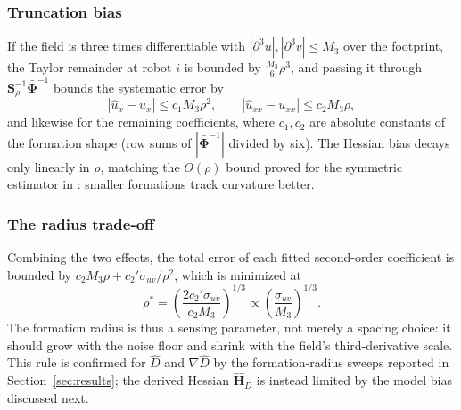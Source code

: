 \documentclass[lettersize,journal]{IEEEtran}
\begin{document}
\subsubsection{Truncation bias}
If the field is three times differentiable with
$|\partial^3 u|, |\partial^3 v| \leq M_3$ over the footprint, the Taylor
remainder at robot $i$ is bounded by $\tfrac{M_3}{6}\rho^3$, and passing
it through $\mathbf{S}_\rho^{-1}\bar{\boldsymbol{\Phi}}^{-1}$ bounds the
systematic error by
\begin{equation}
    |\hat{u}_x - u_x| \leq c_1 M_3 \rho^2, \qquad
    |\hat{u}_{xx} - u_{xx}| \leq c_2 M_3 \rho,
    \label{eq:truncation}
\end{equation}
and likewise for the remaining coefficients, where $c_1, c_2$ are
absolute constants of the formation shape (row sums of
$|\bar{\boldsymbol{\Phi}}^{-1}|$ divided by six). The Hessian bias decays
only linearly in $\rho$, matching the $O(\rho)$ bound proved for the
symmetric estimator in \cite{15}: smaller formations track curvature better.

\subsubsection{The radius trade-off}
Combining the two effects, the total error of each fitted second-order
coefficient is bounded by
$c_2 M_3 \rho + c_2' \sigma_{uv}/\rho^2$, which is minimized at
\begin{equation}
    \rho^* = \left(\frac{2 c_2' \sigma_{uv}}{c_2 M_3}\right)^{1/3}
    \propto \left(\frac{\sigma_{uv}}{M_3}\right)^{1/3}.
    \label{eq:rho_star}
\end{equation}
The formation radius is thus a sensing parameter, not merely a spacing
choice: it should grow with the noise floor and shrink with the field's
third-derivative scale. This rule is confirmed for $\hat{D}$ and
$\nabla\hat{D}$ by the formation-radius sweeps reported in
Section~\ref{sec:results}; the derived Hessian $\hat{\mathbf{H}}_D$ is
instead limited by the model bias discussed next.
\end{document}
